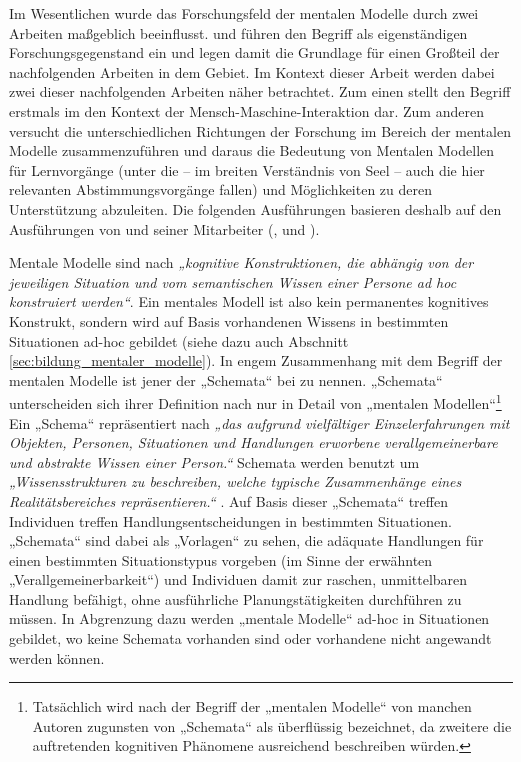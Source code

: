 Im Wesentlichen wurde das Forschungsfeld der mentalen Modelle durch zwei Arbeiten maßgeblich beeinflusst. \citet{Johnson-Laird81} und \citet{Kleer81} führen den Begriff als eigenständigen Forschungsgegenstand ein und legen damit die Grundlage für einen Großteil der nachfolgenden Arbeiten in dem Gebiet. Im Kontext dieser Arbeit werden dabei zwei dieser nachfolgenden Arbeiten näher betrachtet. Zum einen stellt \citet{Norman83} den Begriff erstmals im den Kontext der Mensch-Maschine-Interaktion dar. Zum anderen versucht \citet{Seel91} die unterschiedlichen Richtungen der Forschung im Bereich der mentalen Modelle zusammenzuführen und daraus die Bedeutung von Mentalen Modellen für Lernvorgänge (unter die -- im breiten Verständnis von Seel -- auch die hier relevanten Abstimmungsvorgänge fallen) und Möglichkeiten zu deren Unterstützung abzuleiten. Die folgenden Ausführungen basieren deshalb auf den Ausführungen von \citeauthor{Seel91} und seiner Mitarbeiter (\citet{Ifenthaler06}, \citet{Pirnay-Dummer06} und \citet{Hanke06}).

Mentale Modelle sind nach \citet[][S. 7]{Ifenthaler06} \emph{„kognitive Konstruktionen, die abhängig von der jeweiligen Situation und vom semantischen Wissen einer Persone ad hoc konstruiert werden“}. Ein mentales Modell ist also kein permanentes kognitives Konstrukt, sondern wird auf Basis vorhandenen Wissens in bestimmten Situationen ad-hoc gebildet (siehe dazu auch Abschnitt \ref{sec:bildung_mentaler_modelle}). In engem Zusammenhang mit dem Begriff der mentalen Modelle ist jener der „Schemata“ bei zu nennen. „Schemata“ unterscheiden sich ihrer Definition nach nur in Detail von „mentalen Modellen“\footnote{Tatsächlich wird nach \citet{Ifenthaler06} der Begriff der „mentalen Modelle“ von manchen Autoren zugunsten von „Schemata“ als überflüssig bezeichnet, da zweitere die auftretenden kognitiven Phänomene ausreichend beschreiben würden.} Ein „Schema“ repräsentiert nach \citet[][S. 57]{Seel03a} \emph{„das aufgrund vielfältiger Einzelerfahrungen mit Objekten, Personen, Situationen und Handlungen erworbene verallgemeinerbare und abstrakte Wissen einer Person.“} Schemata werden benutzt um \emph{„Wissensstrukturen zu beschreiben, welche typische Zusammenhänge eines Realitätsbereiches repräsentieren.“} \citep[][S. 8]{Ifenthaler06}. Auf Basis dieser „Schemata“ treffen Individuen treffen Handlungsentscheidungen in bestimmten Situationen. „Schemata“ sind dabei als „Vorlagen“ zu sehen, die adäquate Handlungen für einen bestimmten Situationstypus vorgeben (im Sinne der erwähnten „Verallgemeinerbarkeit“) und Individuen damit zur raschen, unmittelbaren Handlung befähigt, ohne ausführliche Planungstätigkeiten durchführen zu müssen. In Abgrenzung dazu werden „mentale Modelle“ ad-hoc in Situationen gebildet, wo keine Schemata vorhanden sind oder vorhandene nicht angewandt werden können. 

